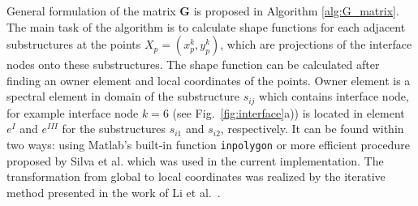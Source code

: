 \documentclass[a4paper,12pt]{article}
\begin{document}
General formulation of the matrix \textbf{G} is proposed in Algorithm 
\ref{alg:G_matrix}.
The main task of the algorithm is to calculate shape functions for each 
adjacent substructures at the points $X_p=(x_p^k,y_p^k)$, which are projections 
of the interface nodes onto these substructures.
The shape function can be calculated after finding an owner element and local 
coordinates of the points. Owner element is a spectral element in domain of the 
substructure $s_{ij}$ which contains interface node, for example interface node 
$k=6$ (see Fig.~\ref{fig:interface}a)) is located in element $e^I$ and 
$e^{III}$ for the substructures $s_{i1}$ and $s_{i2}$, respectively.
It can be found within two ways: using Matlab's built-in function 
\verb+inpolygon+ or more efficient procedure proposed by Silva et al. 
\cite{silva2009exact} which was used in the current implementation.
The transformation from global to local coordinates was realized by the 
iterative method presented in the work of Li et al.~\cite{li2014efficient}.
\end{document}
